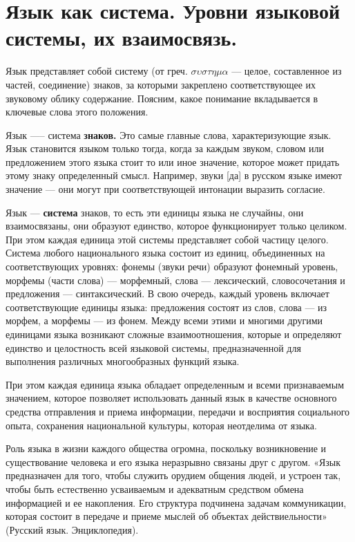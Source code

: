 \section{Язык как система. Уровни языковой системы, их взаимосвязь.}

Язык представляет собой систему (от греч. $\sigma \upsilon \sigma \tau \eta \mu \alpha$ --- целое, составленное из частей, соединение) знаков, за которыми закреплено соответствующее их звуковому облику содержание.
Поясним, какое понимание вкладывается в ключевые слова этого положения.

Язык —-- система \textbf{знаков.}
Это самые главные слова, характеризующие язык.
Язык становится языком только тогда, когда за каждым звуком, словом или предложением этого языка стоит то или иное значение, которое может придать этому знаку определенный смысл.
Например, звуки [да] в русском языке имеют значение — они могут при соответствующей интонации выразить согласие.

Язык --- \textbf{система} знаков, то есть эти единицы языка не случайны, они взаимосвязаны, они образуют единство, которое функционирует только целиком.
При этом каждая единица этой системы представляет собой частицу целого.
Система любого национального языка состоит из единиц, объединенных на соответствующих уровнях: фонемы (звуки речи) образуют фонемный уровень, морфемы (части слова) --- морфемный, слова --- лексический, словосочетания и предложения --- синтаксический.
В свою очередь, каждый уровень включает соответствующие единицы языка: предложения состоят из слов, слова --- из морфем, а морфемы --- из фонем.
Между всеми этими и многими другими единицами языка возникают сложные взаимоотношения, которые и определяют единство и целостность всей языковой системы, предназначенной для выполнения различных многообразных функций языка.

При этом каждая единица языка обладает определенным и всеми признаваемым значением, которое позволяет использовать данный язык в качестве основного средства отправления и приема информации, передачи и восприятия социального опыта, сохранения национальной культуры, которая неотделима от языка.

Роль языка в жизни каждого общества огромна, поскольку возникновение и существование человека и его языка неразрывно связаны друг с другом.
«Язык предназначен для того, чтобы служить орудием общения людей, и устроен так, чтобы быть естественно усваиваемым и адекватным средством обмена информацией и ее накопления.
Его структура подчинена задачам коммуникации, которая состоит в передаче и приеме мыслей об объектах действиельности» (Русский язык. Энциклопедия).

